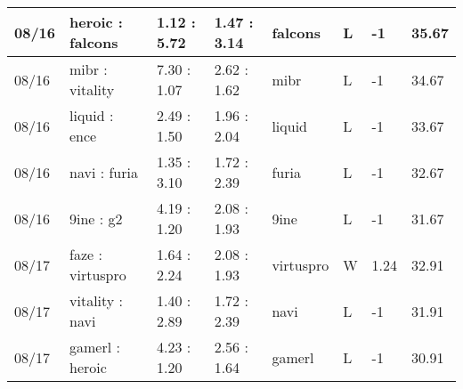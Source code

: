 \begin{small}
\begin{longtable}{|l|l|l|l|l|l|l|l|}
	08/16                               & heroic : falcons                    & 1.12 : 5.72                             & 1.47 : 3.14                             & falcons                           & L                                 & -1                                   & 35.67                             \\ \hline
	08/16                               & mibr : vitality                     & 7.30 : 1.07                             & 2.62 : 1.62                             & mibr                              & L                                 & -1                                   & 34.67                             \\ \hline
	08/16                               & liquid : ence                       & 2.49 : 1.50                             & 1.96 : 2.04                             & liquid                            & L                                 & -1                                   & 33.67                             \\ \hline
	08/16                               & navi : furia                        & 1.35 : 3.10                             & 1.72 : 2.39                             & furia                             & L                                 & -1                                   & 32.67                             \\ \hline
	08/16                               & 9ine : g2                           & 4.19 : 1.20                             & 2.08 : 1.93                             & 9ine                              & L                                 & -1                                   & 31.67                             \\ \hline
	08/17                               & faze : virtuspro                    & 1.64 : 2.24                             & 2.08 : 1.93                             & virtuspro                         & W                                 & 1.24                                 & 32.91                             \\ \hline
	08/17                               & vitality : navi                     & 1.40 : 2.89                             & 1.72 : 2.39                             & navi                              & L                                 & -1                                   & 31.91                             \\ \hline
	08/17                               & gamerl : heroic                     & 4.23 : 1.20                             & 2.56 : 1.64                             & gamerl                            & L                                 & -1                                   & 30.91                             \\ \hline

\end{longtable}
\end{small}
